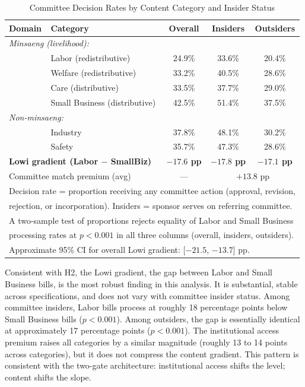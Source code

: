\documentclass[11pt]{article}
\begin{document}
\begin{table}[htbp]
\centering
\caption{Committee Decision Rates by Content Category and Insider Status}
\label{tab:lowi}
\begin{tabular}{llccc}
\toprule
Domain & Category & Overall & Insiders & Outsiders \\
\midrule
\multicolumn{5}{l}{\textit{Minsaeng (livelihood):}} \\
& Labor (redistributive) & 24.9\% & 33.6\% & 20.4\% \\
& Welfare (redistributive) & 33.2\% & 40.5\% & 28.6\% \\
& Care (distributive) & 33.5\% & 37.7\% & 29.0\% \\
& Small Business (distributive) & 42.5\% & 51.4\% & 37.5\% \\[4pt]
\multicolumn{5}{l}{\textit{Non-minsaeng:}} \\
& Industry & 37.8\% & 48.1\% & 30.2\% \\
& Safety & 35.7\% & 47.3\% & 28.6\% \\
\midrule
\multicolumn{2}{l}{\textbf{Lowi gradient (Labor $-$ SmallBiz)}} & \textbf{$-17.6$ pp} & \textbf{$-17.8$ pp} & \textbf{$-17.1$ pp} \\
\multicolumn{2}{l}{Committee match premium (avg)} & --- & \multicolumn{2}{c}{$+13.8$ pp} \\
\bottomrule
\multicolumn{5}{l}{\footnotesize Decision rate = proportion receiving any committee action (approval, revision,} \\
\multicolumn{5}{l}{\footnotesize rejection, or incorporation). Insiders = sponsor serves on referring committee.} \\
\multicolumn{5}{l}{\footnotesize A two-sample test of proportions rejects equality of Labor and Small Business} \\
\multicolumn{5}{l}{\footnotesize processing rates at $p < 0.001$ in all three columns (overall, insiders, outsiders).} \\
\multicolumn{5}{l}{\footnotesize Approximate 95\% CI for overall Lowi gradient: [$-21.5$, $-13.7$] pp.} \\
\end{tabular}
\end{table}

Consistent with H2, the Lowi gradient, the gap between Labor and Small Business bills, is the most robust finding in this analysis. It is substantial, stable across specifications, and does not vary with committee insider status. Among committee insiders, Labor bills process at roughly 18 percentage points below Small Business bills ($p < 0.001$). Among outsiders, the gap is essentially identical at approximately 17 percentage points ($p < 0.001$). The institutional access premium raises all categories by a similar magnitude (roughly 13 to 14 points across categories), but it does not compress the content gradient. This pattern is consistent with the two-gate architecture: institutional access shifts the level; content shifts the slope.
\end{document}
